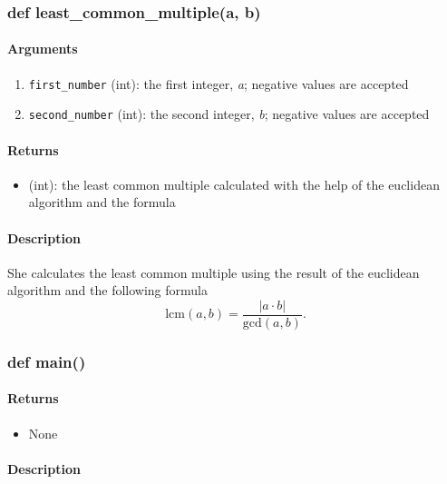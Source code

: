 \documentclass[refman]{scrartcl}
\begin{document}
\subsubsection{def least\_common\_multiple(a, b)}

\paragraph*{Arguments}

\begin{enumerate}
  \item \texttt{first\_number} (int): the first integer, \textit{a}; negative values are accepted
  \item \texttt{second\_number} (int): the second integer, \textit{b}; negative values are accepted
\end{enumerate}

\paragraph*{Returns}

\begin{itemize}
  \item (int): the least common multiple calculated with the help of the euclidean algorithm and the formula
\end{itemize}

\paragraph*{Description}

She calculates the least common multiple using the result of the euclidean algorithm and the following formula
%
\[\text{lcm}(a, b) = \frac{|a \cdot b|}{\text{gcd}(a, b)} \text{.}\]

\subsubsection{def main()}

\paragraph*{Returns}

\begin{itemize}
	\item None
\end{itemize}

\paragraph*{Description}
\end{document}
